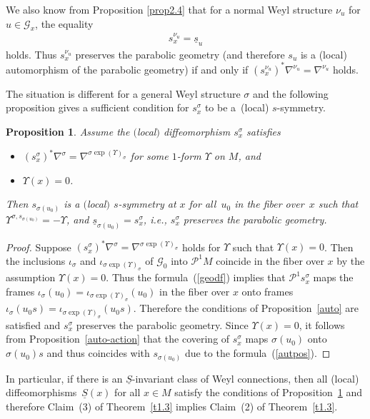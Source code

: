 \documentclass[10pt,a4paper]{amsart}
\newcommand{\si}{\sigma}
\newcommand{\un}{\underline}
\newcommand{\ba}{\mathcal{G}}
\newcommand{\U}{\Upsilon}
\numberwithin{equation}{section}
\newtheorem{Proposition}[Theorem]{Proposition}
 { \theoremstyle{definition}
\newtheorem{Definition}[Theorem]{Definition}
\newtheorem{Example}[Theorem]{Example}
\newtheorem{Remark}[Theorem]{Remark} }
\begin{document}
We also know from Proposition \ref{prop2.4} that for a normal Weyl structure $\nu_u$ for $u\in\ba_x$, the equality
\begin{gather*}s^{\nu_u}_x=\un s_u\end{gather*}
holds. Thus $s^{\nu_u}_x$ preserves the parabolic geometry (and therefore $s_u$ is a (local) automorphism of the parabolic geometry) if and only if $(s^{\nu_u}_x)^*\nabla^{\nu_u}=\nabla^{\nu_{u}}$ holds.

The situation is dif\/ferent for a general Weyl structure $\si$ and the following proposition gives a suf\/f\/icient condition for $s^\si_x$ to be a~(local) $s$-symmetry.

\begin{Proposition} \label{geodesic-s-symm}
Assume the $($local$)$ diffeomorphism $s^{\si}_x$ satisfies
\begin{itemize}\itemsep=0pt
\item $(s^{\si}_x)^*\nabla^\si=\nabla^{\si\exp (\U)_\si}$ for some $1$-form $\U$ on $M$,
and
\item $\U(x)=0$.
\end{itemize}
Then $s_{\si(u_0)}$ is a $($local$)$ $s$-symmetry at $x$ for all~$u_0$ in the fiber over~$x$ such that $\U^{\si,s_{\si(u_0)}}=-\U$, and $\un s_{\si(u_0)}=s^{\si}_x$, i.e., $s^{\si}_x$
preserves the parabolic geometry.
\end{Proposition}
\begin{proof}
Suppose $(s^{\si}_x)^*\nabla^\si=\nabla^{\si\exp(\U)_\si}$ holds for $\U$ such that $\U(x)=0$. Then the inclusions $\iota_{\si}$ and $\iota_{\si\exp(\U)_\si}$ of $\ba_0$ into $\mathcal{P}^1M$ coincide in the f\/iber over $x$ by the assumption $\U(x)=0$. Thus the formula~(\ref{geodf}) implies that $\mathcal{P}^1s^{\si}_x$ maps the frames $\iota_{\si}(u_0)=\iota_{\si\exp (\U)_\si}(u_0)$ in the f\/iber over $x$ onto frames $\iota_{\si}(u_0s)=\iota_{\si\exp(\U)_\si}(u_0s)$. Therefore the conditions of Proposition~\ref{auto} are satisf\/ied and $s^{\si}_x$ preserves the parabolic geometry. Since $\U(x)=0$, it follows from Proposition~\ref{auto-action} that the covering of $s^{\si}_x$ maps $\si(u_0)$ onto $\si(u_0)s$ and thus coincides with $s_{\si(u_0)}$ due to the for\-mu\-la~(\ref{autpos}).
\end{proof}

In particular, if there is an $\un S$-invariant class of Weyl connections, then all (local) dif\/feo\-mor\-phisms~$\un S(x)$ for all $x\in M$ satisfy the conditions of Proposition~\ref{geodesic-s-symm} and therefore Claim~(3) of Theorem~\ref{t1.3} implies Claim~(2) of Theorem~\ref{t1.3}.
\end{document}
